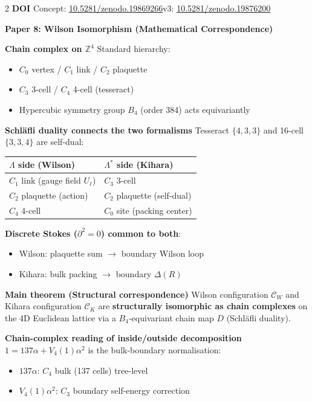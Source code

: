 \documentclass[9pt,a4paper]{article}
\begin{document}
\begin{multicols}{2}
\smallskip
\textbf{DOI}\enspace
{\scriptsize Concept: \href{https://doi.org/10.5281/zenodo.19869266}{10.5281/zenodo.19869266}\enspace v3: \href{https://doi.org/10.5281/zenodo.19876200}{10.5281/zenodo.19876200}}

\columnbreak

\textbf{\large Paper 8: Wilson Isomorphism (Mathematical Correspondence)}

\smallskip
\textbf{Chain complex on $\mathbb{Z}^4$}\enspace
Standard hierarchy:
\begin{itemize}[topsep=1pt]
\item $C_0$ vertex / $C_1$ link / $C_2$ plaquette
\item $C_3$ 3-cell / $C_4$ 4-cell (tesseract)
\item Hypercubic symmetry group $B_4$ (order 384) acts equivariantly
\end{itemize}

\smallskip
\textbf{Schl\"afli duality connects the two formalisms}\enspace
Tesseract $\{4,3,3\}$ and 16-cell $\{3,3,4\}$ are self-dual:

\vspace{1pt}
{\footnotesize
\begin{tabular}{@{}ll@{}}
\toprule
$\Lambda$ side (Wilson) & $\Lambda^*$ side (Kihara) \\
\midrule
$C_1$ link (gauge field $U_\ell$) & $C_3$ 3-cell \\
$C_2$ plaquette (action) & $C_2$ plaquette (self-dual) \\
$C_4$ 4-cell & $C_0$ site (packing center) \\
\bottomrule
\end{tabular}
}

\smallskip
\textbf{Discrete Stokes ($\partial^2=0$) common to both}:
\begin{itemize}[topsep=1pt]
\item Wilson: plaquette sum $\to$ boundary Wilson loop
\item Kihara: bulk packing $\to$ boundary $\Delta(R)$
\end{itemize}

\smallskip
\textbf{Main theorem (Structural correspondence)}\enspace
{\footnotesize Wilson configuration $\mathcal{C}_W$ and Kihara configuration $\mathcal{C}_K$ are \textbf{structurally isomorphic as chain complexes} on the 4D Euclidean lattice via a $B_4$-equivariant chain map $D$ (Schl\"afli duality).}

\smallskip
\textbf{Chain-complex reading of inside/outside decomposition}\enspace
$1 = 137\alpha + V_4(1)\alpha^2$ is the bulk-boundary normalisation:
\begin{itemize}[topsep=1pt]
\item $137\alpha$: $C_4$ bulk (137 cells) tree-level
\item $V_4(1)\alpha^2$: $C_3$ boundary self-energy correction
\end{itemize}


\end{multicols}
\end{document}

